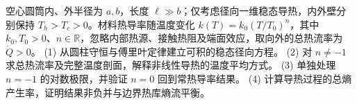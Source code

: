 空心圆筒内、外半径为 \(a,b\)，长度 \(\ell\gg b\)；仅考虑径向一维稳态导热，内外壁分别保持 \(T_h>T_c>0\)。材料热导率随温度变化 \(k(T)=k_0(T/T_0)^n\)，其中 \(k_0,T_0>0\)、\(n\in\mathbb R\)，忽略内部热源、接触热阻及端面效应，取向外的总热流率为 \(\dot Q>0\)。
(1) 从圆柱守恒与傅里叶定律建立可积的稳态径向方程。
(2) 对 \(n\ne-1\) 求总热流率及完整温度剖面，解释非线性导热的温度平均方式。
(3) 单独处理 \(n=-1\) 的对数极限，并验证 \(n=0\) 回到常热导率结果。
(4) 计算导热过程的总熵产生率，证明结果非负并与边界热库熵流平衡。
